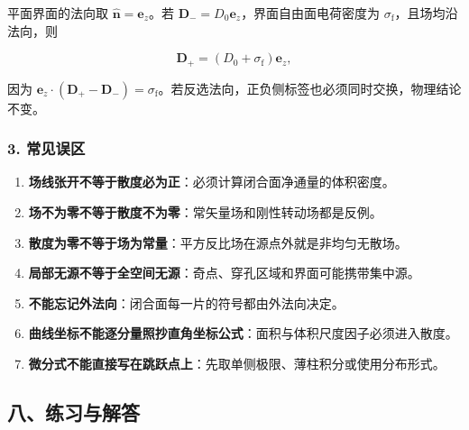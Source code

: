 平面界面的法向取 \(\hat{\mathbf n}=\mathbf e_z\)。若
\(\mathbf D_-=D_0\mathbf e_z\)，界面自由面电荷密度为
\(\sigma_{\mathrm f}\)，且场均沿法向，则

\[
\mathbf D_+=(D_0+\sigma_{\mathrm f})\mathbf e_z,
\]

因为
\(\mathbf e_z\cdot(\mathbf D_+-\mathbf D_-)=\sigma_{\mathrm f}\)。若反选法向，正负侧标签也必须同时交换，物理结论不变。

\subsubsection{3. 常见误区}\label{m1:ux5e38ux89c1ux8befux533a}

\begin{enumerate}
\def\labelenumi{\arabic{enumi}.}
\tightlist
\item
  \textbf{场线张开不等于散度必为正}：必须计算闭合面净通量的体积密度。
\item
  \textbf{场不为零不等于散度不为零}：常矢量场和刚性转动场都是反例。
\item
  \textbf{散度为零不等于场为常量}：平方反比场在源点外就是非均匀无散场。
\item
  \textbf{局部无源不等于全空间无源}：奇点、穿孔区域和界面可能携带集中源。
\item
  \textbf{不能忘记外法向}：闭合面每一片的符号都由外法向决定。
\item
  \textbf{曲线坐标不能逐分量照抄直角坐标公式}：面积与体积尺度因子必须进入散度。
\item
  \textbf{微分式不能直接写在跳跃点上}：先取单侧极限、薄柱积分或使用分布形式。
\end{enumerate}

\subsection{八、练习与解答}\label{m1:ux516bux7ec3ux4e60ux4e0eux89e3ux7b54-1}

